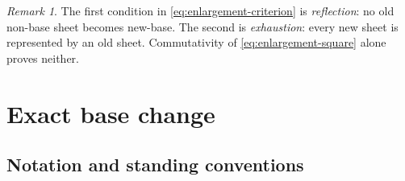 \documentclass[11pt,reqno]{amsart}
\theoremstyle{definition}
\theoremstyle{remark}
\newtheorem{remark}[theorem]{Remark}
\begin{document}
\begin{remark}\label{rem:reflection-exhaustion}
The first condition in \eqref{eq:enlargement-criterion} is \emph{reflection}: no old non-base sheet becomes new-base.  The second is \emph{exhaustion}: every new sheet is represented by an old sheet.  Commutativity of \eqref{eq:enlargement-square} alone proves neither.
\end{remark}



\section{Exact base change}
\label{sec:basechange}

\subsection*{Notation and standing conventions}
\end{document}
